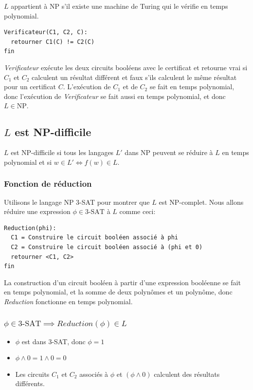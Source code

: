 \documentclass[10pt]{article}
\newcommand{\NP}{\text{NP}}
\begin{document}
$L$ appartient à NP s'il existe une machine de Turing qui le vérifie
en temps polynomial.

\begin{verbatim}
Verificateur(C1, C2, C):
  retourner C1(C) != C2(C)
fin
\end{verbatim}

\emph{Verificateur} exécute les deux circuits booléens avec le
certificat et retourne vrai si $C_1$ et $C_2$ calculent un résultat
différent et faux s'ils calculent le même résultat pour un certificat
$C$.  L'exécution de $C_1$ et de $C_2$ se fait en temps polynomial,
donc l'exécution de \emph{Verificateur} se fait aussi en temps
polynomial, et donc $L \in \NP$.

\subsection{$L$ est NP-difficile}

$L$ est NP-difficile si tous les langages $L'$ dans NP peuvent se
réduire à $L$ en temps polynomial et si $w \in L' \iff f(w) \in L$.

\subsubsection{Fonction de réduction}

Utilisons le langage NP 3-SAT pour montrer que $L$ est NP-complet.
Nous allons réduire une expression $\phi \in \text{3-SAT}$ à $L$ comme
ceci:

\begin{verbatim}
Reduction(phi):
  C1 = Construire le circuit booléen associé à phi
  C2 = Construire le circuit booléen associé à (phi et 0)
  retourner <C1, C2>
fin
\end{verbatim}

La construction d'un circuit booléen à partir d'une expression
booléenne se fait en temps polynomial, et la somme de deux polynômes
et un polynôme, donc \emph{Reduction} fonctionne en temps polynomial.

\subsubsection{$\phi \in \text{3-SAT} \implies Reduction(\phi) \in L$}

\begin{itemize}
\item $\phi$ est dans 3-SAT, donc $\phi = 1$
\item $\phi \wedge 0 = 1 \wedge 0 = 0$
\item Les circuits $C_1$ et $C_2$ associés à $\phi$ et $(\phi \wedge 0)$
  calculent des résultats différents.
\end{itemize}
\end{document}
